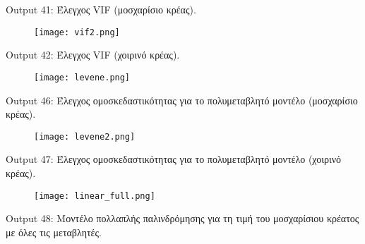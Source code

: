 \documentclass[10pt]{article}
\begin{document}
\begin{centering}


\renewcommand{\caption}{Output 41: }
\caption {  Έλεγχος VIF (μοσχαρίσιο κρέας). }
\end{centering}


 \begin{figure}[H]
    \centering
    \texttt{[image: vif2.png]}
    
    \label{fig:galaxy}
\end{figure}

\begin{centering}


\renewcommand{\caption}{Output 42: }
\caption {  Έλεγχος VIF (χοιρινό κρέας). }
\end{centering}








\begin{figure}[H]
    \centering
    \texttt{[image: levene.png]}
    
    \label{fig:galaxy}
\end{figure}

\begin{centering}


\renewcommand{\caption}{Output 46: }
\caption {  Έλεγχος ομοσκεδαστικότητας για το πολυμεταβλητό μοντέλο (μοσχαρίσιο κρέας). }
\end{centering}

\begin{figure}[H]
    \centering
    \texttt{[image: levene2.png]}
    
    \label{fig:galaxy}
\end{figure}

\begin{centering}


\renewcommand{\caption}{Output 47: }
\caption {  Έλεγχος ομοσκεδαστικότητας για το πολυμεταβλητό μοντέλο (χοιρινό κρέας). }
\end{centering}

\begin{figure}[H]
    \centering
    \texttt{[image: linear\_full.png]}
    
    \label{fig:galaxy}
\end{figure}

\begin{centering}


\renewcommand{\caption}{Output 48: }
\caption {  Μοντέλο πολλαπλής παλινδρόμησης για τη τιμή του μοσχαρίσιου κρέατος με όλες τις μεταβλητές. }
\end{centering}
\end{document}
